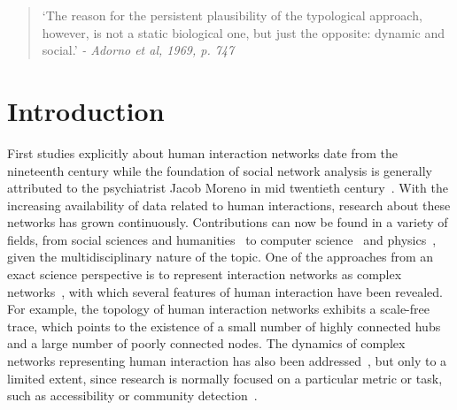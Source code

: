 \documentclass[%
	aip,
	jmp,%
	amsmath,amssymb,
	reprint,%
]{revtex4-1}
\begin{document}
\begin{quotation}
	`The reason for the persistent plausibility of the typological approach, however, is not a static biological one, but just the opposite: dynamic and social.' 
	\emph{- Adorno et al, 1969, p. 747}
\end{quotation}


\section{Introduction}\label{sec:into}
First studies explicitly about human interaction networks 
date from the nineteenth century while the foundation of
social network analysis is generally attributed to the psychiatrist Jacob Moreno in mid twentieth century~\cite{moreno,newmanBook}.
With the increasing availability of data related to human interactions, research about these networks has grown continuously. Contributions can now be found in a variety of fields, from social sciences and humanities~\cite{latour2013} to computer science~\cite{bird} and physics~\cite{barabasiHumanDyn,newmanFriendship}, given the multidisciplinary nature of the topic. One of the approaches from an exact science perspective is to represent interaction networks as complex networks~\cite{barabasiHumanDyn,newmanFriendship}, with which 
several features of human interaction have been revealed. For example, the topology of human interaction networks exhibits a scale-free trace, which points to the existence of a small number of highly connected hubs and a large number of poorly connected nodes. The dynamics of complex networks representing human interaction has also been addressed~\cite{barabasiEvo,newmanEvolving}, but only to a limited extent, since research is normally focused on a particular metric or task, such as accessibility or community detection~\cite{access,newmanModularity}. 
\end{document}
